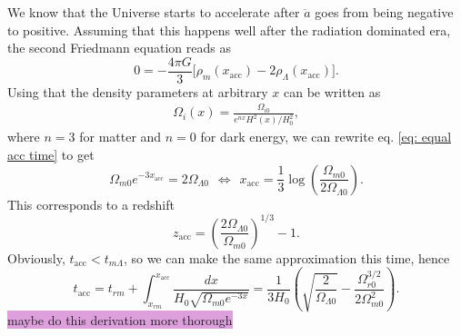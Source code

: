 \documentclass{aa}
\begin{document}
We know that the Universe starts to accelerate after $\ddot{a}$ goes from being negative to positive. Assuming that this happens well after the radiation dominated era, the second Friedmann equation reads as 
\begin{equation}
  0 = - \frac{4\pi G}{3}\Big[\rho_m(x_\text{acc})- 2\rho_\Lambda(x_\text{acc})\Big]. \label{eq: equal acc time}
\end{equation}
Using that the density parameters at arbitrary $x$ can be written as
\begin{align}
  \Omega_i(x) = \frac{\Omega_{i0}}{e^{nx}H^2(x)/H_0^2},
\end{align}
where $n = 3$ for matter and $n=0$ for dark energy, we can rewrite eq. \eqref{eq: equal acc time} to get
\begin{equation}
  \Omega_{m0}e^{-3x_\text{acc}} = 2\Omega_{\Lambda0}
  \hspace{5pt}\Leftrightarrow\hspace{5pt}
  x_\text{acc} = \frac{1}{3}\log\left(\frac{\Omega_{m0}}{2\Omega_{\Lambda0}}\right).
\end{equation}
This corresponds to a redshift
\begin{equation}
  z_\text{acc} = \left(\frac{2\Omega_{\Lambda0}}{\Omega_{m0}}\right)^{1/3}-1.
\end{equation}
Obviously, $t_\text{acc}<t_{m\Lambda}$, so we can make the same approximation this time, hence
\begin{equation}
  t_\text{acc} = t_{rm} + \int^{x_\text{acc}}_{x_{rm}}\frac{dx}{H_0\sqrt{\Omega_{m0}e^{-3x}}} = \frac{1}{3H_0}\left(\sqrt{\frac{2}{\Omega_{\Lambda0}}} -\frac{\Omega_{r0}^{3/2}}{2\Omega_{m0}^2}\right).
\end{equation}
\colorbox{Plum}{maybe do this derivation more thorough}
\end{document}
